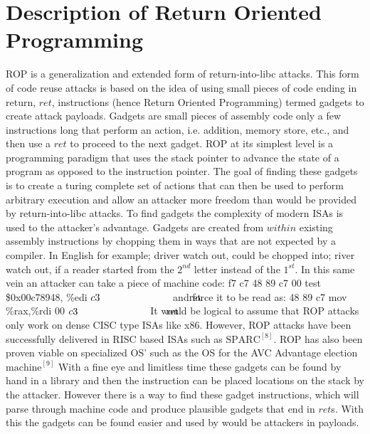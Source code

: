 \documentclass[11pt]{amsart}
\newcommand{\tab}[1]{\hspace{.2\textwidth}\rlap{#1}}
\begin{document}
\section*{Description of Return Oriented Programming}
ROP is a generalization and extended form of return-into-libc attacks. This form of code reuse attacks is based on the idea of using small pieces of code ending in return, $ret$, instructions (hence Return Oriented Programming) termed gadgets to create attack payloads. Gadgets are small pieces of assembly code only a few instructions long that perform an action, i.e. addition, memory store, etc., and then use a $ret$ to proceed to the next gadget. ROP at its simplest level is a programming paradigm that uses the stack pointer to advance the state of a program as opposed to the instruction pointer. The goal of finding these gadgets is to create a turing complete set of actions that can then be used to perform arbitrary execution and allow an attacker more freedom than would be provided by return-into-libc attacks. \newline \newline
To find gadgets the complexity of modern ISAs is used to the attacker’s advantage. Gadgets are created from $within$ existing assembly instructions by chopping them in ways that are not expected by a compiler. In English for example; driver watch out, could be chopped into; river watch out, if a reader started from the $2^{nd}$ letter instead of the $1^{st}$. In this same vein an attacker can take a piece of machine code: \newline
\hspace*{10 mm} f7 c7 48 89 c7 00 \hspace*{10 mm} test \$0x00c78948, \%edi \newline
\hspace*{10 mm} $c3\tab{\hspace*{6 mm} ret}$ \newline 
and force it to be read as: \newline
\hspace*{10 mm} 48 89 c7 \hspace*{26 mm}mov \%rax,\%rdi \newline
\hspace*{10 mm} $00$ \newline
\hspace*{10 mm} $c3\tab{\hspace*{6 mm} ret}$ \newline \newline
It would be logical to assume that ROP attacks only work on dense CISC type ISAs like x86. However, ROP attacks have been successfully delivered in RISC based ISAs such as $\text{SPARC}^{[8]}$. ROP has also been proven viable on specialized OS' such as the OS for the AVC Advantage election $\text{machine}^{[9]}$ \newline \newline
With a fine eye and limitless time these gadgets can be found by hand in a library and then the instruction can be placed locations on the stack by the attacker. However there is a way to find these gadget instructions, which will parse through machine code and produce plausible gadgets that end in $ret$s. With this the gadgets can be found easier and used by would be attackers in payloads.
\end{document}
